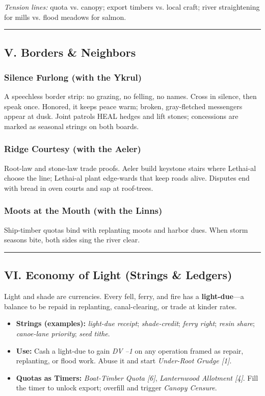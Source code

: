 \documentclass[11pt]{article}
\begin{document}
\textit{Tension lines:} quota vs. canopy; export timbers vs. local craft; river straightening for mills vs. flood meadows for salmon.

\medskip\hrule\medskip

\subsection{V. Borders \& Neighbors}

\subsubsection*{Silence Furlong (with the Ykrul)}
A speechless border strip: no grazing, no felling, no names. Cross in silence, then speak once. Honored, it keeps peace warm; broken, gray-fletched messengers appear at dusk. Joint patrols HEAL hedges and lift stones; concessions are marked as seasonal strings on both boards.

\subsubsection*{Ridge Courtesy (with the Aeler)}
Root-law and stone-law trade proofs. Aeler build keystone stairs where Lethai-al choose the line; Lethai-al plant edge-wards that keep roads alive. Disputes end with bread in oven courts and sap at roof-trees.

\subsubsection*{Moots at the Mouth (with the Linns)}
Ship-timber quotas bind with replanting moots and harbor dues. When storm seasons bite, both sides sing the river clear.

\medskip\hrule\medskip

\subsection{VI. Economy of Light (Strings \& Ledgers)}

Light and shade are currencies. Every fell, ferry, and fire has a \textbf{light-due}---a balance to be repaid in replanting, canal-clearing, or trade at kinder rates.

\begin{itemize}[leftmargin=*]
  \item \textbf{Strings (examples):} \emph{light-due receipt}; \emph{shade-credit}; \emph{ferry right}; \emph{resin share}; \emph{canoe-lane priority}; \emph{seed tithe}.
  \item \textbf{Use:} Cash a light-due to gain \emph{DV --1} on any operation framed as repair, replanting, or flood work. Abuse it and start \emph{Under-Root Grudge [1]}.
  \item \textbf{Quotas as Timers:} \emph{Boat-Timber Quota [6]}, \emph{Lanternwood Allotment [4]}. Fill the timer to unlock export; overfill and trigger \emph{Canopy Censure}.
\end{itemize}
\end{document}
